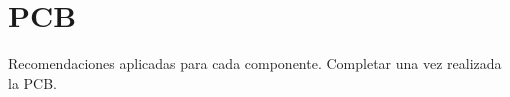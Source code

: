 \section{PCB}

Recomendaciones aplicadas para cada componente. 
Completar una vez realizada la PCB. 